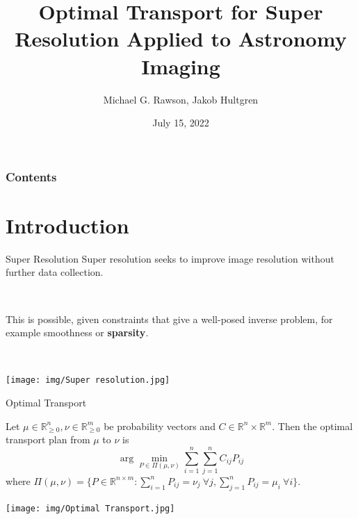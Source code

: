 \documentclass{beamer}
\title[Optimal Transport for Super Resolution] %
{Optimal Transport for Super Resolution Applied to Astronomy Imaging}
\author[Rawson, Hultgren] %
{Michael G. Rawson\inst{1,2}, 
Jakob Hultgren\inst{2}
}
\institute[] %
{
  \inst{1}%
  Pacific Northwest National Laboratory, Seattle, WA, USA \\
  \inst{2}
  University of Maryland at College Park, College Park, MD, USA
}
\date[] %
{July 15, 2022}
\begin{document}
\begin{frame}
	\titlepage
\end{frame}

\begin{frame}
    \frametitle{Contents}
    \begin{minipage}{\textwidth}
    \tableofcontents       
    \end{minipage}
\end{frame}

\section{Introduction}


\begin{frame}{Super Resolution}
    Super resolution seeks to improve image resolution without further data collection.
    \pause
    
    ~
    
    This is possible, given constraints that give a well-posed inverse problem, for example smoothness or \textbf{sparsity}.
    \pause
    
    ~
    
    \centerline{\texttt{[image: img/Super resolution.jpg]}}
    
    
\end{frame}


\begin{frame}{Optimal Transport}
    \begin{definition}
    Let $\mu\in\mathbb R^n_{\ge 0}, \nu \in \mathbb R^m_{\ge 0}$ be probability vectors and $C\in \mathbb R^n\times \mathbb R^m$.     
    \pause
    Then the optimal transport plan from $\mu$ to $\nu$ is                            
\begin{equation} 
    \arg\min_{P\in \Pi(\mu,\nu)} \sum_{i=1}^n \sum_{j=1}^n C_{ij} P_{ij} 
\end{equation}
\pause
where 
$ \Pi(\mu,\nu) = \{P\in\mathbb R^{n\times m}: \sum_{i=1}^n P_{ij} = \nu_j\ \forall j, \sum_{j=1}^n P_{ij} = \mu_i\ \forall i\}. $
    \end{definition}
    \centerline{\texttt{[image: img/Optimal Transport.jpg]}}
\end{frame}
\end{document}
